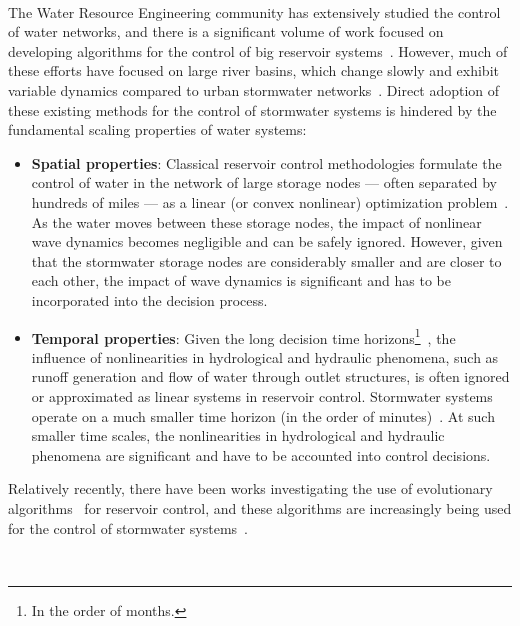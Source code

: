 \

The Water Resource Engineering community has extensively studied the control of water networks, and there is a significant volume of work focused on developing algorithms for the control of big reservoir systems~\cite{Haimes_1977,Labadie_2004,Yeh_1985,Reed_Hadka_Herman_Kasprzyk_Kollat_2013}.
However, much of these efforts have focused on large river basins, which change slowly and exhibit variable dynamics compared to urban stormwater networks~\cite{loucks2017water, te2010applied}.
Direct adoption of these existing methods for the control of stormwater systems is hindered by the fundamental scaling properties of water systems:
\begin{itemize}
	\item \textbf{Spatial properties}: Classical reservoir control methodologies formulate the control of water in the network of large storage nodes --- often separated by hundreds of miles --- as a linear (or convex nonlinear) optimization problem~\cite{Haimes_1977}.
As the water moves between these storage nodes, the impact of nonlinear wave dynamics becomes negligible and can be safely ignored.
However, given that the stormwater storage nodes are considerably smaller and are closer to each other, the impact of wave dynamics is significant and has to be incorporated into the decision process. 
\item \textbf{Temporal properties}: Given the long decision time horizons\footnote{In the order of months.}~\cite{You_Cai_2008}, the influence of nonlinearities in hydrological and hydraulic phenomena, such as runoff generation and flow of water through outlet structures, is often ignored or approximated as linear systems in reservoir control.
Stormwater systems operate on a much smaller time horizon (in the order of minutes)~\cite{lund2018}.
At such smaller time scales, the nonlinearities in hydrological and hydraulic phenomena are significant and have to be accounted into control decisions.
\end{itemize}
Relatively recently, there have been works investigating the use of evolutionary algorithms~\cite{Reed_Hadka_Herman_Kasprzyk_Kollat_2013, maier2014,Bessler_Savic_Walters_2003} for reservoir control, and these algorithms are increasingly being used for the control of stormwater systems~\cite{shishegar2018optimization,lund2018}.

\


